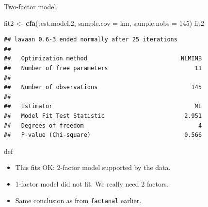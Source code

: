\documentclass[ignorenonframetext,]{beamer}
\newenvironment{Shaded}{\begin{snugshade}}{\end{snugshade}}
\newcommand{\DataTypeTok}[1]{\textcolor[rgb]{0.13,0.29,0.53}{#1}}
\newcommand{\DecValTok}[1]{\textcolor[rgb]{0.00,0.00,0.81}{#1}}
\newcommand{\FloatTok}[1]{\textcolor[rgb]{0.00,0.00,0.81}{#1}}
\newcommand{\KeywordTok}[1]{\textcolor[rgb]{0.13,0.29,0.53}{\textbf{#1}}}
\newcommand{\NormalTok}[1]{#1}
\newcommand{\StringTok}[1]{\textcolor[rgb]{0.31,0.60,0.02}{#1}}
\begin{document}
\begin{frame}[fragile]{Two-factor model}
\protect\hypertarget{two-factor-model}{}

\begin{Shaded}
\begin{Highlighting}[]
\NormalTok{fit2 <-}\StringTok{ }\KeywordTok{cfa}\NormalTok{(test.model}\FloatTok{.2}\NormalTok{, }\DataTypeTok{sample.cov =}\NormalTok{ km, }\DataTypeTok{sample.nobs =} \DecValTok{145}\NormalTok{)}
\NormalTok{fit2}
\end{Highlighting}
\end{Shaded}

\begin{verbatim}
## lavaan 0.6-3 ended normally after 25 iterations
## 
##   Optimization method                           NLMINB
##   Number of free parameters                         11
## 
##   Number of observations                           145
## 
##   Estimator                                         ML
##   Model Fit Test Statistic                       2.951
##   Degrees of freedom                                 4
##   P-value (Chi-square)                           0.566
\end{verbatim}

def

\begin{itemize}
\item
  This fits OK: 2-factor model supported by the data.
\item
  1-factor model did not fit. We really need 2 factors.
\item
  Same conclusion as from \texttt{factanal} earlier.
\end{itemize}

\end{frame}
\end{document}
